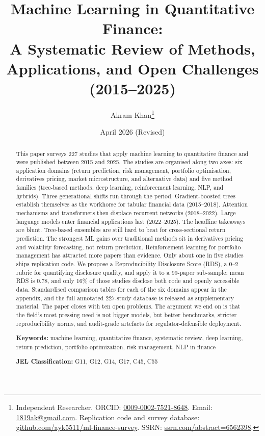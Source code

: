 \documentclass[12pt,a4paper]{article}
\title{Machine Learning in Quantitative Finance:\\A Systematic Review of Methods, Applications, and Open Challenges (2015--2025)}
\author{
    Akram Khan\thanks{Independent Researcher. ORCID: \href{https://orcid.org/0009-0002-7521-8648}{0009-0002-7521-8648}. Email: \href{mailto:1819ak@gmail.com}{1819ak@gmail.com}. Replication code and survey database: \href{https://github.com/ayk5511/ml-finance-survey}{github.com/ayk5511/ml-finance-survey}. SSRN: \href{https://ssrn.com/abstract=6562398}{ssrn.com/abstract=6562398}.}
}
\date{April 2026 (Revised)}
\begin{document}
\maketitle

\begin{abstract}
This paper surveys 227 studies that apply machine learning to quantitative finance and were published between 2015 and 2025. The studies are organised along two axes: six application domains (return prediction, risk management, portfolio optimisation, derivatives pricing, market microstructure, and alternative data) and five method families (tree-based methods, deep learning, reinforcement learning, NLP, and hybrids). Three generational shifts run through the period. Gradient-boosted trees establish themselves as the workhorse for tabular financial data (2015--2018). Attention mechanisms and transformers then displace recurrent networks (2018--2022). Large language models enter financial applications last (2022--2025). The headline takeaways are blunt. Tree-based ensembles are still hard to beat for cross-sectional return prediction. The strongest ML gains over traditional methods sit in derivatives pricing and volatility forecasting, not return prediction. Reinforcement learning for portfolio management has attracted more papers than evidence. Only about one in five studies ships replication code. We propose a Reproducibility Disclosure Score (RDS), a 0--2 rubric for quantifying disclosure quality, and apply it to a 99-paper sub-sample: mean RDS is 0.78, and only 16\% of those studies disclose both code and openly accessible data. Standardised comparison tables for each of the six domains appear in the appendix, and the full annotated 227-study database is released as supplementary material. The paper closes with ten open problems. The argument we end on is that the field's most pressing need is not bigger models, but better benchmarks, stricter reproducibility norms, and audit-grade artefacts for regulator-defensible deployment.

\medskip
\noindent\textbf{Keywords:} machine learning, quantitative finance, systematic review, deep learning, return prediction, portfolio optimization, risk management, NLP in finance

\medskip
\noindent\textbf{JEL Classification:} G11, G12, G14, G17, C45, C55
\end{abstract}

\newpage
\tableofcontents
\newpage


\end{document}
